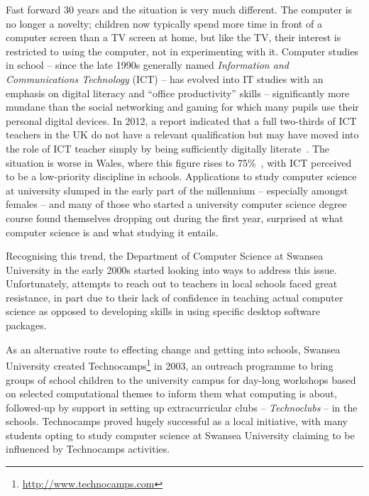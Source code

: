 \documentclass{sig-alternate}
\begin{document}
Fast forward 30 years and the situation is very much different. The
computer is no longer a novelty; children now typically spend more
time in front of a computer screen than a TV screen at home, but like
the TV, their interest is restricted to using the computer, not in
experimenting with it. Computer studies in school -- since the late
1990s generally named {\emph{Information and Communications
Technology}} (ICT) -- has evolved into IT studies with an emphasis on
digital literacy and ``office productivity'' skills -- significantly
more mundane than the social networking and gaming for which many
pupils use their personal digital devices. In 2012, a report indicated
that a full two-thirds of ICT teachers in the UK do not have a
relevant qualification but may have moved into the role of ICT teacher
simply by being sufficiently digitally literate~\cite{RoyalSoc:2012}.
The situation is worse in Wales, where this figure rises to
75\%~\cite{GTCW:2008}, with ICT perceived to be a low-priority
discipline in schools. Applications to study computer science at
university slumped in the early part of the millennium -- especially
amongst females -- and many of those who started a university computer
science degree course found themselves dropping out during the first
year, surprised at what computer science is and what studying it
entails.

Recognising this trend, the Department of Computer Science at Swansea
University in the early 2000s started looking into ways to address
this issue.  Unfortunately, attempts to reach out to teachers in local
schools faced great resistance, in part due to their lack of
confidence in teaching actual computer science as opposed to
developing skills in using specific desktop software packages.

As an alternative route to effecting change and getting into schools,
Swansea University created
Technocamps\footnote{\url{http://www.technocamps.com}} in 2003, an
outreach programme to bring groups of school children to the
university campus for day-long workshops based on selected
computational themes to inform them what computing is about,
followed-up by support in setting up extracurricular clubs --
\emph{Technoclubs} -- in the schools.  Technocamps proved hugely
successful as a local initiative, with many students opting to study
computer science at Swansea University claiming to be influenced by
Technocamps activities.
\end{document}
